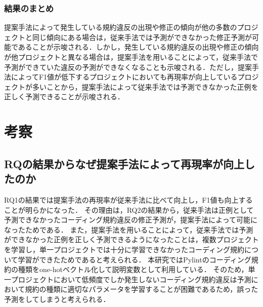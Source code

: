 \documentclass[submit,noauthor,ses,dvipdfmx]{ipsj}
\begin{document}
\subsubsection{結果のまとめ}

提案手法によって発生している規約違反の出現や修正の傾向が他の多数のプロジェクトと同じ傾向にある場合は，従来手法では予測ができなかった修正予測が可能であることが示唆される．しかし，発生している規約違反の出現や修正の傾向が他プロジェクトと異なる場合は，提案手法を用いることによって，従来手法で予測ができていた違反の予測ができなくなることも示唆される．ただし，提案手法によってF1値が低下するプロジェクトにおいても再現率が向上しているプロジェクトが多いことから，提案手法によって従来手法では予測できなかった正例を正しく予測できることが示唆される．

\section{考察}\label{chap:consideration}

\subsection{RQの結果からなぜ提案手法によって再現率が向上したのか}\label{kosatu}

RQ1の結果では提案手法の再現率が従来手法に比べて向上し，F1値も向上することが明らかになった．
その理由は，RQ2の結果から，従来手法は正例として予測できなかったコーディング規約違反の修正予測が，提案手法によって可能になったためである．
また，提案手法を用いることによって，従来手法では予測ができなかった正例を正しく予測できるようになったことは，複数プロジェクトを学習し，単一プロジェクトでは十分に学習できなかったコーディング規約について学習ができたためであると考えられる．
本研究ではPylintのコーディング規約の種類をone-hotベクトル化して説明変数として利用している．
そのため，単一プロジェクトにおいて低頻度でしか発生しないコーディング規約違反は予測において規約の種類に適切なパラメータを学習することが困難であるため，誤った予測をしてしまうと考えられる．
\end{document}
